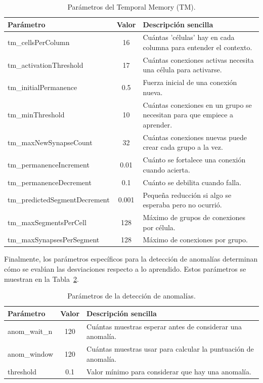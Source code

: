 \begin{table}[H]
  \centering
  \small
  \begin{tabular}{l c p{7cm}}
    \hline
    \textbf{Parámetro} & \textbf{Valor} & \textbf{Descripción sencilla} \\
    \hline
    tm\_cellsPerColumn & 16 & Cuántas 'células' hay en cada columna para entender el contexto. \\
    tm\_activationThreshold & 17 & Cuántas conexiones activas necesita una célula para activarse. \\
    tm\_initialPermanence & 0.5 & Fuerza inicial de una conexión nueva. \\
    tm\_minThreshold & 10 & Cuántas conexiones en un grupo se necesitan para que empiece a aprender. \\
    tm\_maxNewSynapseCount & 32 & Cuántas conexiones nuevas puede crear cada grupo a la vez. \\
    tm\_permanenceIncrement & 0.01 & Cuánto se fortalece una conexión cuando acierta. \\
    tm\_permanenceDecrement & 0.1 & Cuánto se debilita cuando falla. \\
    tm\_predictedSegmentDecrement & 0.001 & Pequeña reducción si algo se esperaba pero no ocurrió. \\
    tm\_maxSegmentsPerCell & 128 & Máximo de grupos de conexiones por célula. \\
    tm\_maxSynapsesPerSegment & 128 & Máximo de conexiones por grupo. \\
    \hline
  \end{tabular}
  \caption{Parámetros del Temporal Memory (TM).}
  \label{tab:tm_params}
\end{table}

\medskip

Finalmente, los parámetros específicos para la detección de anomalías determinan cómo se evalúan las desviaciones respecto a lo aprendido. Estos parámetros se muestran en la Tabla~\ref{tab:anomaly_params}.

\begin{table}[H]
  \centering
  \small
  \begin{tabular}{l c p{7cm}}
    \hline
    \textbf{Parámetro} & \textbf{Valor} & \textbf{Descripción sencilla} \\
    \hline
    anom\_wait\_n & 120 & Cuántas muestras esperar antes de considerar una anomalía. \\
    anom\_window & 120 & Cuántas muestras usar para calcular la puntuación de anomalía. \\
    threshold & 0.1 & Valor mínimo para considerar que hay una anomalía. \\
    \hline
  \end{tabular}
  \caption{Parámetros de la detección de anomalías.}
  \label{tab:anomaly_params}
\end{table}

